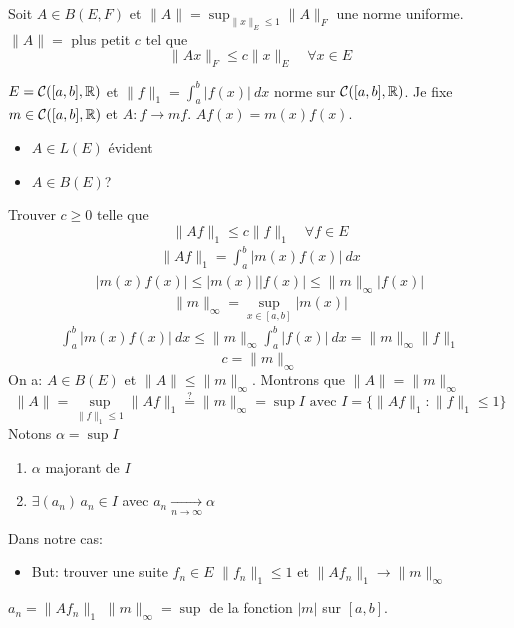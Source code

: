 \begin{prop}
   Soit $A \in B(E, F)$ et $\|A\| = \sup_{\|x\|_E \le 1} \|A\|_F$  une norme uniforme. $\|A\| = $ plus petit  $c$ tel que 
    \[
   \|Ax\|_F \le c \|x\|_E \quad \forall x \in E
   \] 
\end{prop}
\begin{preuve}
    $E = \mathcal{C}([a, b], \mathbb{R})$ et $\|f\|_1 = \int_{{a}}^{{b}} {|f(x)|} \: d{x}$ norme sur $\mathcal{C}([a, b], \mathbb{R})$. Je fixe $m \in \mathcal{C}([a, b], \mathbb{R})$ et $A: f \to mf$. $Af(x) = m(x)f(x)$. 
    \begin{itemize}
        \item $A \in L(E)$ évident
        \item $A \in B(E)$?
    \end{itemize}
    Trouver $c \ge 0$ telle que 
    \[
    \|Af\|_{1} \le c \|f\|_1 \quad \forall f \in E
    \] 
    \begin{align*}
        \|Af\|_1 = \int_{{a}}^{{b}} {|m(x)f(x)|} \: d{x}
    \end{align*}
    \begin{align*}
        |m(x)f(x)| \le |m(x)| |f(x)| \le \|m\|_{\infty} |f(x)|
    \end{align*}
    \[
        \|m\|_{\infty} = \sup_{x \in [a, b]}|m(x)|
    \] 
    \begin{align*}
        \int_{{a}}^{{b}} {|m(x)f(x)|} \: d{x} \le \|m\|_{\infty}\int_{{a}}^{{b}} {|f(x)|} \: d{x} = \|m\|_{\infty}\|f\|_1
    \end{align*}
    \[
    c = \|m\|_{\infty}
    \] 
    On a: $A \in B(E)$ et $\|A\| \le \|m\|_{\infty}$. Montrons que $\|A\| = \|m\|_{\infty}$
    \[
        \|A\| = \sup_{\|f\|_1 \le 1} \|Af\|_{1} \overset{?}{=} \|m\|_{\infty} = \sup I \text{ avec } I = \{ \|Af\|_{1} : \|f\|_{1} \le 1 \}
    \] 
    Notons $\alpha = \sup I$
     \begin{enumerate}
        \item $\alpha$ majorant de  $I$
        \item  $\exists (a_n) \, a_n \in I$ avec $a_n \xrightarrow[n \to \infty]{} \alpha$
    \end{enumerate}
    Dans notre cas:
    \begin{itemize}
        \item But: trouver une suite $f_n \in E$ $\|f_n\|_1 \le 1$ et $\|Af_n\|_{1} \to \|m\|_{\infty}$
    \end{itemize}
    $a_n = \|Af_n\|_{1}$ $\|m\|_{\infty} = \sup$ de la fonction $|m|$ sur  $[a, b]$.
     \begin{itemize}

\end{itemize}
\end{preuve}
